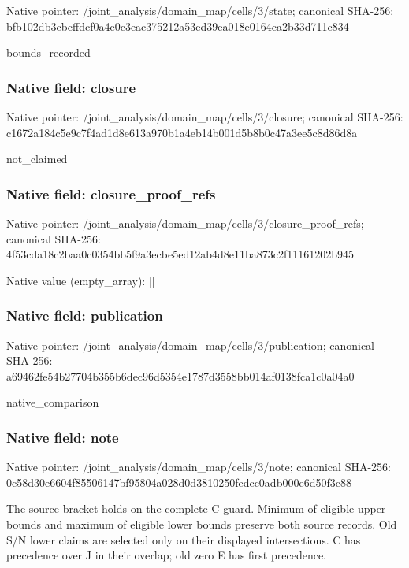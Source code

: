 \documentclass[10pt,a4paper]{article}
\begin{document}
Native pointer: /joint\_analysis/domain\_m\allowbreak{}ap/cells/3/state; canonical SHA-256: bfb102db3cbcffdcf0a4e0c3\allowbreak{}eac375212a53ed39ea018e01\allowbreak{}64ca2b33d711c834


bounds\_recorded


\subsubsection{Native field: closure}


Native pointer: /joint\_analysis/domain\_m\allowbreak{}ap/cells/3/closure; canonical SHA-256: c1672a184c5e9c7f4ad1d8e6\allowbreak{}13a970b1a4eb14b001d5b8b0\allowbreak{}c47a3ee5c8d86d8a


not\_claimed


\subsubsection{Native field: closure\_proof\_refs}


Native pointer: /joint\_analysis/domain\_m\allowbreak{}ap/cells/3/closure\_proof\allowbreak{}\_refs; canonical SHA-256: 4f53cda18c2baa0c0354bb5f\allowbreak{}9a3ecbe5ed12ab4d8e11ba87\allowbreak{}3c2f11161202b945



Native value (empty\_array): []



\subsubsection{Native field: publication}


Native pointer: /joint\_analysis/domain\_m\allowbreak{}ap/cells/3/publication; canonical SHA-256: a69462fe54b27704b355b6de\allowbreak{}c96d5354e1787d3558bb014a\allowbreak{}f0138fca1c0a04a0


native\_comparison


\subsubsection{Native field: note}


Native pointer: /joint\_analysis/domain\_map/cells/3/note; canonical SHA-256: 0c58d30e6604f85506147bf9\allowbreak{}5804a028d0d3810250fedcc0\allowbreak{}adb000e6d50f3c88


The source bracket holds on the complete C guard. Minimum of eligible upper bounds and maximum of eligible lower bounds preserve both source records. Old S/N lower claims are selected only on their displayed intersections. C has precedence over J in their overlap; old zero E has first precedence.
\end{document}

